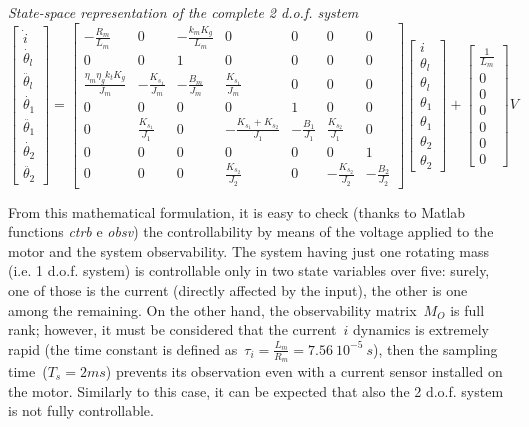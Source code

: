 \textit{State-space representation of the complete 2 d.o.f. system}
\begin{equation}
	\begin{bmatrix}
		\dot{i} \\
		\dot{\theta_l} \\
		\ddot{\theta_l} \\
		\dot{\theta_1} \\
		\ddot{\theta_1} \\
		\dot{\theta_2} \\
		\ddot{\theta_2}
	\end{bmatrix}
	=
	\begin{bmatrix}
		-\frac{R_m}{L_m} & 0 & -\frac{k_m K_g}{L_m} & 0 & 0 & 0 & 0 \\
		0 & 0 &1 & 0 & 0 & 0 & 0 \\
		\frac{\eta_m \eta_g k_t K_g}{J_m} & -\frac{K_{s_1}}{J_m} & -\frac{B_m}{J_m} & \frac{K_{s_1}}{J_m} & 0 & 0 & 0 \\
		0 & 0 & 0 & 0 & 1 & 0 & 0 \\
		0 & \frac{K_{s_1}}{J_1} & 0 & -\frac{K_{s_1}+K_{s_2}}{J_1} & -\frac{B_1}{J_1} & \frac{K_{s_2}}{J_1} & 0 \\
		0 & 0 & 0 & 0 & 0 & 0 & 1 \\
		0 & 0 & 0 & \frac{K_{s_2}}{J_2} & 0 & -\frac{K_{s_2}}{J_2} & -\frac{B_2}{J_2}
	\end{bmatrix}
	\begin{bmatrix}
		i \\
		\theta_l \\
		\theta_l \\
		\theta_1 \\
		\theta_1 \\
		\theta_2 \\
		\theta_2
	\end{bmatrix}
	+
	\begin{bmatrix}
		\frac{1}{L_m} \\
		0 \\
		0 \\
		0 \\
		0 \\
		0 \\
		0
	\end{bmatrix}
	V
\end{equation}

From this mathematical formulation, it is easy to check (thanks to Matlab functions  \textit{ctrb} e \textit{obsv}) the controllability by means of the voltage applied to the motor and the system observability.
The system having just one rotating mass (i.e. 1 d.o.f. system) is controllable only in two state variables over five: surely, one of those is the current (directly affected by the input), the other is one among the remaining. On the other hand, the observability matrix~$M_O$ is full rank; however, it must be considered that the current~$i$ dynamics is extremely rapid (the time constant is defined as~$\tau_i = \frac{L_m}{R_m} = 7.56\ 10^{-5} \ s$), then the sampling time~($T_s = 2 ms$) prevents its observation even with a current sensor installed on the motor.
Similarly to this case, it can be expected that also the 2 d.o.f. system is not fully controllable. \\

